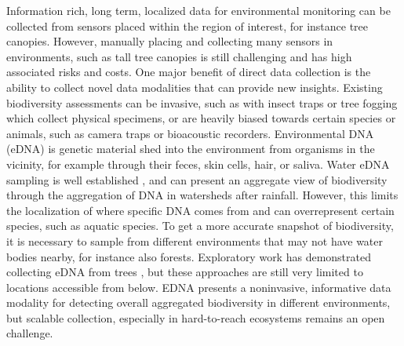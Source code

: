 Information rich, long term, localized data for environmental monitoring can be collected from sensors placed within the region of interest, for instance tree canopies.
However, manually placing and collecting many sensors in environments, such as tall tree canopies is still challenging and has high associated risks and costs.
One major benefit of direct data collection is the ability to collect novel data modalities that can provide new insights. Existing biodiversity assessments can be invasive, such as with insect traps or tree fogging which collect physical specimens, or are heavily biased towards certain species or animals, such as camera traps or bioacoustic recorders. Environmental DNA (eDNA) is genetic material shed into the environment from organisms in the vicinity, for example through their feces, skin cells, hair, or saliva. Water eDNA sampling is well established \cite{}, and can present an aggregate view of biodiversity through the aggregation of DNA in watersheds after rainfall. However, this limits the localization of where specific DNA comes from and can overrepresent certain species, such as aquatic species. To get a more accurate snapshot of biodiversity, it is necessary to sample from different environments that may not have water bodies nearby, for instance also forests. Exploratory work has demonstrated collecting eDNA from trees \cite{}, but these approaches are still very limited to locations accessible from below. EDNA presents a noninvasive, informative data modality for detecting overall aggregated biodiversity in different environments, but scalable collection, especially in hard-to-reach ecosystems remains an open challenge.


